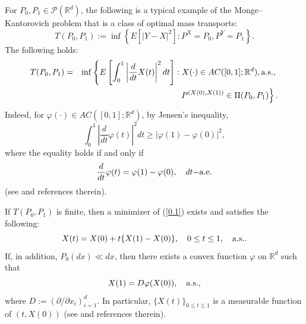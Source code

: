 \documentclass[12pt]{article}
\begin{document}
For $P_0,P_1\in \mathcal{P}(\mathbb{R}^d)$, the following is a typical example of the Monge--Kantorovich problem
that is a class of optimal mass transports:
\begin{equation}
T(P_0,P_1):=\inf\left\{E[|Y-X|^2]:P^X=P_0, P^Y=P_1\right\}.
\end{equation}
The following holds:
\begin{eqnarray}T(P_0,P_1)&=&\inf\left\{E\left[\int_0^1\left|\frac{d}{dt}X(t)\right|^2dt\right]:X(\cdot)\in AC([0,1];\mathbb{R}^d), {\rm a.s. }, \right.\label{0.1}\\
&&\qquad \left.P^{(X(0), X(1))}\in \Pi(P_0,P_1)\right\}.\nonumber
\end{eqnarray}
Indeed, for $\varphi (\cdot)\in AC([0,1];\mathbb{R}^d)$, by Jensen's inequality,
$$\int_0^1\left|\frac{d}{dt}\varphi (t)\right|^2dt\ge |\varphi (1)-\varphi (0)|^2,$$
where the equality holds if and only if 
$$\frac{d}{dt}\varphi (t)=\varphi (1)-\varphi (0),\quad dt{\rm -a.e.}$$ 
(see \cite{M09, M2021, 1-RR, 1-V2} and references therein).

If $T(P_0,P_1)$ is finite, then a minimizer of (\ref{0.1}) exists and satisfies the following:
\begin{equation}\label{1.2.0}
X(t)=X(0)+t\{X(1)-X(0)\},\quad 0\le t\le 1, \quad {\rm a.s.}.
\end{equation}%
If, in addition, $P_0(dx)\ll dx$, then
there exists a convex function $\varphi$ on $\mathbb{R}^d$ such that 
\begin{equation}\label{1.3.0810}
X(1)=D\varphi(X(0)),\quad {\rm a.s.},
\end{equation}
where $D:=(\partial /\partial x_i)_{i=1}^d$.
In particular, $\{X(t)\}_{0\le t\le 1}$ is a measurable function of $(t,X(0))$
(see \cite{Bre1, Bre2,GangboMcCann,1-RR, 1-V2} and references therein).
\end{document}
